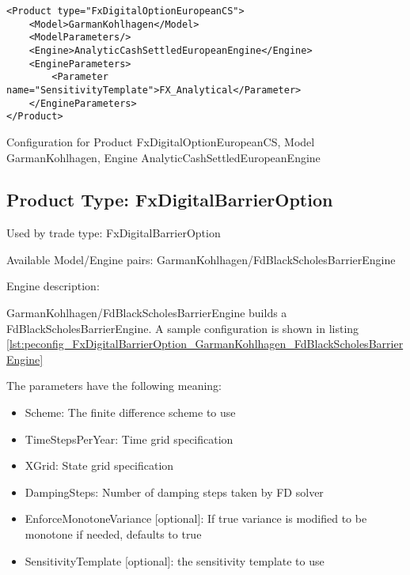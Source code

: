 \begin{longlisting}
\begin{verbatim}
<Product type="FxDigitalOptionEuropeanCS">
    <Model>GarmanKohlhagen</Model>
    <ModelParameters/>
    <Engine>AnalyticCashSettledEuropeanEngine</Engine>
    <EngineParameters>
        <Parameter name="SensitivityTemplate">FX_Analytical</Parameter>
    </EngineParameters>
</Product>
\end{verbatim}
\caption{Configuration for Product FxDigitalOptionEuropeanCS, Model GarmanKohlhagen, Engine AnalyticCashSettledEuropeanEngine}
\label{lst:peconfig_FxDigitalOptionEuropeanCS_GarmanKohlhagen_AnalyticCashSettledEuropeanEngine}
\end{longlisting}

\subsection{Product Type: FxDigitalBarrierOption}

Used by trade type: FxDigitalBarrierOption

Available Model/Engine pairs: GarmanKohlhagen/FdBlackScholesBarrierEngine

Engine description:

GarmanKohlhagen/FdBlackScholesBarrierEngine builds a FdBlackScholesBarrierEngine. A sample configuration is shown in
listing \ref{lst:peconfig_FxDigitalBarrierOption_GarmanKohlhagen_FdBlackScholesBarrierEngine}

The parameters have the following meaning:

\begin{itemize}
\item Scheme: The finite difference scheme to use
\item TimeStepsPerYear: Time grid specification
\item XGrid: State grid specification
\item DampingSteps: Number of damping steps taken by FD solver
\item EnforceMonotoneVariance [optional]: If true variance is modified to be monotone if needed, defaults to true
\item SensitivityTemplate [optional]: the sensitivity template to use 
\end{itemize}

